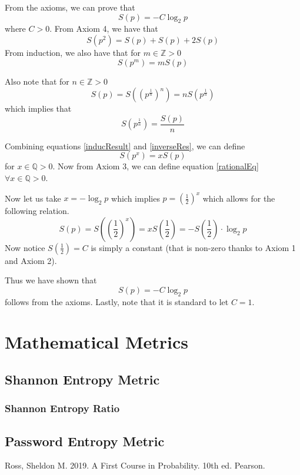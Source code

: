 \documentclass{article}
\begin{document}
\bigskip

From the axioms, we can prove that
\[
S(p) = -C\log_2 p
\]
where $C > 0$.
From Axiom 4, we have that 
\[
S(p^2)=S(p)+S(p)+2S(p)
\]
From induction, we also have that for $m\in \mathbb{Z} > 0$
\begin{equation} \label{inducResult}
    S(p^m)=mS(p)
\end{equation}

Also note that for $n\in \mathbb{Z} > 0$
\[
S(p) = S\left((p^\frac{1}{n})^n\right) = nS(p^\frac{1}{n})
\]
which implies that
\begin{equation} \label{inverseRes}
    S(p^\frac{1}{n}) = \frac{S(p)}{n}
\end{equation}

Combining equations \ref{inducResult} and \ref{inverseRes}, we can define
\begin{equation} \label{rationalEq}
    S(p^x)=xS(p)
\end{equation}
for $x \in \mathbb{Q} >0$. Now from Axiom 3, we can define equation \ref{rationalEq} $\forall x \in\mathbb{Q} >0$.

Now let us take $x=-\log_2 p$ which implies $p=\left(\frac{1}{2}\right)^x$ which allows for the following relation.
\[
S(p) = S\left((\frac{1}{2})^x\right) = xS\left(\frac{1}{2}\right) = -S\left(\frac{1}{2}\right)\cdot\log_2 p
\]
Now notice $S\left(\frac{1}{2}\right) = C$ is simply a constant (that is non-zero thanks to Axiom 1 and Axiom 2).

Thus we have shown that
\begin{equation}
    S(p) = -C\log_2 p
\end{equation}
follows from the axioms.
Lastly, note that it is standard to let $C=1$.


\section{Mathematical Metrics}
\subsection{Shannon Entropy Metric}

\subsubsection{Shannon Entropy Ratio}

\subsection{Password Entropy Metric}

\newpage
\begin{thebibliography}{00}
 Ross, Sheldon M. 2019. A First Course in Probability. 10th ed. Pearson.
\end{thebibliography}
\end{document}
